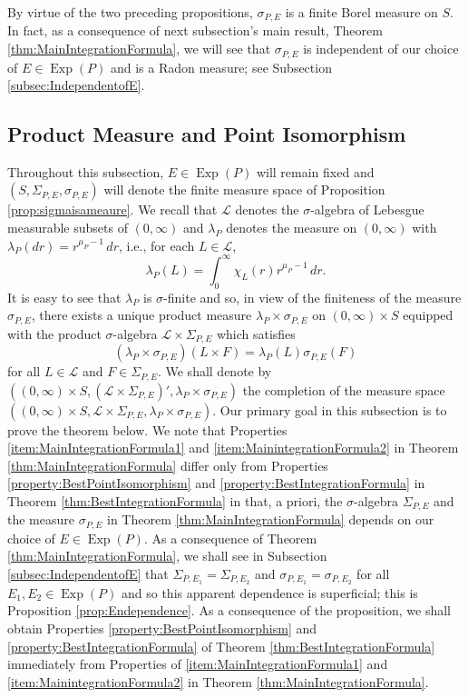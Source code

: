 \documentclass[smallextended]{svjour3}
\theoremstyle{remark}
\newcommand\Exp{\operatorname{Exp}}
\begin{document}
\noindent By virtue of the two preceding propositions, $\sigma_{P,E}$ is a finite Borel measure on $S$. In fact, as a consequence of next subsection's main result, Theorem \ref{thm:MainIntegrationFormula}, we will see that $\sigma_{P,E}$ is independent of our choice of $E\in\Exp(P)$ and is a Radon measure; see Subsection \ref{subsec:IndependentofE}.





\subsection{Product Measure and Point Isomorphism}\label{subsec:ProductMeasure}
Throughout this subsection, $E\in\Exp(P)$ will remain fixed and $(S,\Sigma_{P,E},\sigma_{P,E})$ will denote the finite measure space of Proposition \ref{prop:sigmaisameaure}. We recall that $\mathcal{L}$ denotes the $\sigma$-algebra of Lebesgue measurable subsets of $(0,\infty)$ and  $\lambda_P$ denotes the measure on $(0,\infty)$ with $\lambda_P(dr)=r^{\mu_P-1}\,dr$, i.e., for each $L\in\mathcal{L}$,
\begin{equation*}
\lambda_P(L)=\int_0^\infty \chi_L(r)r^{\mu_P-1}\,dr.
\end{equation*}
It is easy to see that $\lambda_P$ is $\sigma$-finite and so, in view of the finiteness of the measure $\sigma_{P,E}$, there exists a unique product measure $\lambda_P\times\sigma_{P,E}$ on $(0,\infty)\times S$ equipped with the product $\sigma$-algebra $\mathcal{L}\times\Sigma_{P,E}$ which satisfies
\begin{equation*}
    (\lambda_P\times\sigma_{P,E})(L\times F)=\lambda_P(L)\sigma_{P,E}(F)
\end{equation*}
for all $L\in\mathcal{L}$ and $F\in\Sigma_{P,E}$. We shall denote by $((0,\infty)\times S,(\mathcal{L}\times\Sigma_{P,E})',\lambda_P\times\sigma_{P,E})$ the completion of the measure space $((0,\infty)\times S,\mathcal{L}\times\Sigma_{P,E},\lambda_P\times\sigma_{P,E})$. Our primary goal in this subsection is to prove the theorem below. We note that Properties \ref{item:MainIntegrationFormula1} and \ref{item:MainintegrationFormula2} in Theorem \ref{thm:MainIntegrationFormula} differ only from Properties \ref{property:BestPointIsomorphism} and \ref{property:BestIntegrationFormula} in Theorem \ref{thm:BestIntegrationFormula} in that, a priori, the $\sigma$-algebra $\Sigma_{P,E}$ and the measure $\sigma_{P,E}$ in Theorem \ref{thm:MainIntegrationFormula} depends on our choice of $E\in\Exp(P)$. As a consequence of Theorem \ref{thm:MainIntegrationFormula}, we shall see in Subsection \ref{subsec:IndependentofE} that $\Sigma_{P,E_1}=\Sigma_{P,E_2}$ and $\sigma_{P,E_1}=\sigma_{P,E_2}$ for all $E_1,E_2\in\Exp(P)$ and so this apparent dependence is superficial; this is Proposition \ref{prop:Endependence}. As a consequence of the proposition, we shall obtain Properties \ref{property:BestPointIsomorphism} and \ref{property:BestIntegrationFormula} of Theorem \ref{thm:BestIntegrationFormula} immediately from Properties of \ref{item:MainIntegrationFormula1} and \ref{item:MainintegrationFormula2} in Theorem \ref{thm:MainIntegrationFormula}.
\end{document}
